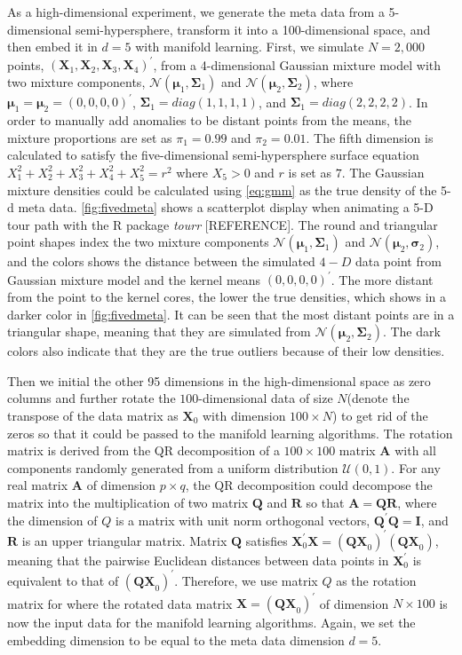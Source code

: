\documentclass[11pt,a4paper,]{article}
\begin{document}
As a high-dimensional experiment, we generate the meta data from a 5-dimensional semi-hypersphere, transform it into a 100-dimensional space, and then embed it in \(d=5\) with manifold learning. First, we simulate \(N=2,000\) points,
\((\pmb{X}_1, \pmb{X}_2, \pmb{X}_3, \pmb{X}_4)^\prime\), from a 4-dimensional Gaussian mixture model with two mixture components,
\(\mathcal{N}(\pmb{\mu}_1, \pmb{\Sigma}_1)\) and \(\mathcal{N}(\pmb{\mu}_2, \pmb{\Sigma}_2)\), where \(\pmb{\mu}_1 = \pmb{\mu}_2 =(0, 0, 0, 0)^\prime\), \(\pmb{\Sigma}_1 = diag(1,1,1,1)\), and \(\pmb{\Sigma}_1 = diag(2,2,2,2)\).
In order to manually add anomalies to be distant points from the means, the mixture proportions are set as \(\pi_1=0.99\) and \(\pi_2=0.01\). The fifth dimension is calculated to satisfy the five-dimensional semi-hypersphere surface equation
\(X_1^2 + X_2^2 + X_3^2 + X_4^2 + X_5^2 = r^2\) where \(X_5>0\) and \(r\) is set as \(7\). The Gaussian mixture densities could be calculated using \autoref{eq:gmm} as the true density of the 5-d meta data.
\autoref{fig:fivedmeta} shows a scatterplot display when animating a 5-D tour path with the R package \emph{tourr} {[}REFERENCE{]}. The round and triangular point shapes index the two mixture components \(\mathcal{N}(\pmb{\mu}_1, \pmb{\Sigma}_1)\) and
\(\mathcal{N}(\pmb{\mu}_2, \pmb{\sigma}_2)\), and the colors shows the distance between the simulated \(4-D\) data point from Gaussian mixture model and the kernel means \((0, 0, 0, 0)^\prime\). The more distant from the point to the kernel cores, the lower the true densities, which shows in a darker color in \autoref{fig:fivedmeta}. It can be seen that the most distant points are in a triangular shape, meaning that they are simulated from \(\mathcal{N}(\pmb{\mu}_2, \pmb{\Sigma}_2)\). The dark colors also indicate that they are the true outliers because of their low densities.

Then we initial the other 95 dimensions in the high-dimensional space as zero columns and further rotate the \(100\)-dimensional data of size \(N\)(denote the transpose of the data matrix as \(\pmb{X}_0\) with dimension \(100 \times N\)) to get rid of the zeros so that it could be passed to the manifold learning algorithms. The rotation matrix is derived from the QR decomposition of a \(100\times 100\) matrix \(\pmb{A}\) with all components randomly generated from a uniform distribution \(\mathcal{U}(0,1)\). For any real matrix \(\pmb{A}\) of dimension \(p\times q\), the QR decomposition could decompose the matrix into the multiplication of two matrix \(\pmb{Q}\) and \(\pmb{R}\) so that \(\pmb{A} = \pmb{QR}\), where the dimension of \(Q\) is a matrix with unit norm orthogonal vectors, \(\pmb{Q}^\prime \pmb{Q} = \pmb{I}\), and \(\pmb{R}\) is an upper triangular matrix. Matrix \(\pmb{Q}\) satisfies
\(\pmb{X}_0^\prime \pmb{X}=(\pmb{QX}_0)^\prime(\pmb{QX}_0)\), meaning that the pairwise Euclidean distances between data points in
\(\pmb{X}_0^\prime\) is equivalent to that of \((\pmb{QX}_0)^\prime\).
Therefore, we use matrix \(Q\) as the rotation matrix for where the rotated data matrix \(\pmb{X} = (\pmb{QX}_0)^\prime\) of dimension \(N \times 100\) is now the input data for the manifold learning algorithms. Again, we set the embedding dimension to be equal to the meta data dimension \(d=5\).
\end{document}
